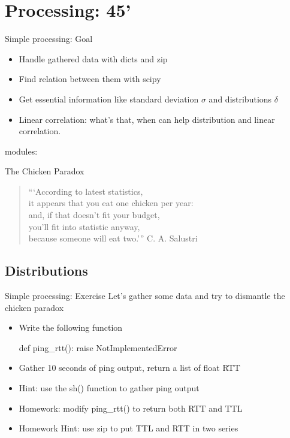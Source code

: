 \section{Processing: 45'}

\begin{pyframe}{Simple processing: Goal}
\begin{itemize}
\item Handle gathered data with dicts and zip
\item Find relation between them with scipy
\item Get essential information like standard deviation $\sigma$ and distributions $\delta$
\item Linear correlation: what's that, when can help
distribution and linear correlation.
\end{itemize}
modules: 
\end{pyframe}


\begin{pyframe}{The Chicken Paradox}
\begin{verse}
```According to latest statistics, \\
it appears that you eat one chicken per year: \\
and, if that doesn't fit your budget,\\
you'll fit into statistic anyway,\\
because someone will eat two.'''
\hfill C. A. Salustri
\end{verse}
\end{pyframe}

\subsection{Distributions}
\begin{pyframe}{Simple processing: Exercise}
Let's gather some data and try to dismantle the chicken paradox
\begin{itemize}
\item Write the following function
\begin{pycode}
def ping_rtt():
    raise NotImplementedError
\end{pycode}
\item Gather 10 seconds of ping output, return a list of float RTT
\item Hint: use the sh() function to gather ping output
\item Homework: modify ping\_rtt() to return both RTT and TTL
\item Homework Hint: use zip to put TTL and RTT in two series
\end{itemize}
\end{pyframe}

